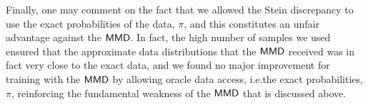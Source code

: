 Finally, one may comment on the fact that we allowed the Stein discrepancy to use the exact probabilities of the data, $\pi$, and this constitutes an unfair advantage against the $\operatorname{\textsf{MMD}}$. In fact, the high number of samples we used ensured that the approximate data distributions that the $\operatorname{\textsf{MMD}}$ received was in fact very close to the exact data, and we found no major improvement for training with the $\operatorname{\textsf{MMD}}$ by allowing oracle data access, i.e.\@ the exact probabilities, $\pi$, reinforcing the fundamental weakness of the $\operatorname{\textsf{MMD}}$ that is discussed above.  
\begin{figure}[ht]
    \centering

\end{figure}
